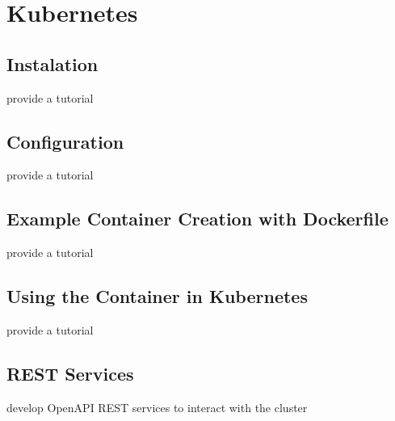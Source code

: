 \chapter{Kubernetes}


\section{Instalation}

\begin{exercise}
provide a tutorial 
\end{exercise}

\section{Configuration}

\begin{exercise}
provide a tutorial 
\end{exercise}

\section{Example Container Creation with Dockerfile}

\begin{exercise}
provide a tutorial 
\end{exercise}

\section{Using the Container in Kubernetes}

\begin{exercise}
provide a tutorial 
\end{exercise}

\section{REST Services}

\begin{exercise}
develop OpenAPI REST services to interact with the cluster
\end{exercise}

